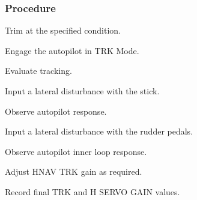 \subsubsection*{Procedure}
 \begin{compactenum}
    \item Trim at the specified condition.
    \item Engage the autopilot in TRK Mode.
    \item Evaluate tracking.
    \item Input a lateral disturbance with the stick.  
    \item Observe autopilot response.
    \item Input a lateral disturbance with the rudder pedals.  
    \item Observe autopilot inner loop response.
    \item Adjust HNAV TRK gain as required.
    \item Record final TRK and H SERVO GAIN values.
    \end{compactenum}
